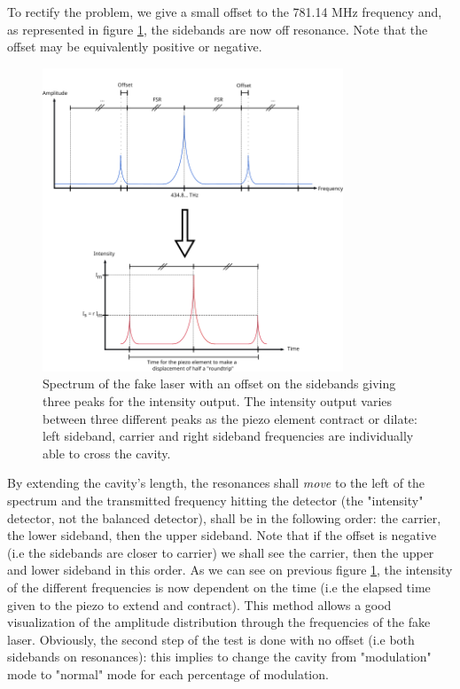 \documentclass[11pt]{report}
\begin{document}
To rectify the problem, we give a small offset to the 781.14 MHz frequency and, as represented in figure \ref{fig:sb-off}, the sidebands are now off resonance. Note that the offset may be equivalently positive or negative.

\begin{figure}[h!]
\centering
\includegraphics[width=0.8\textwidth]{sb-off}
\caption{Spectrum of the fake laser with an offset on the sidebands giving three peaks for the intensity output. The intensity output varies between three different peaks as the piezo element contract or dilate: left sideband, carrier and right sideband frequencies are individually able to cross the cavity.}
\label{fig:sb-off}
\end{figure}

By extending the cavity's length, the resonances shall \textit{move} to the left of the spectrum and the transmitted frequency hitting the detector (the "intensity" detector, not the balanced detector), shall be in the following order: the carrier, the lower sideband, then the upper sideband. Note that if the offset is negative (i.e the sidebands are closer to carrier) we shall see the carrier, then the upper and lower sideband in this order. As we can see on previous figure \ref{fig:sb-off}, the intensity of the different frequencies is now dependent on the time (i.e the elapsed time given to the piezo to extend and contract). This method allows a good visualization of the amplitude distribution through the frequencies of the fake laser. Obviously, the second step of the test is done with no offset (i.e both sidebands on resonances): this implies to change the cavity from "modulation" mode to "normal" mode for each percentage of modulation.
\end{document}
